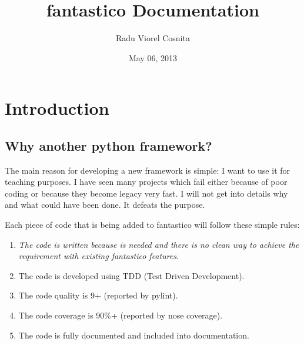 \documentclass[letterpaper,10pt,english]{sphinxmanual}
\title{fantastico Documentation}
\date{May 06, 2013}
\author{Radu Viorel Cosnita}
\begin{document}
\maketitle
\tableofcontents
{}\label{index::doc}



\chapter{Introduction}
\label{intro:introduction}\label{intro::doc}\label{intro:fantastico-framework}

\section{Why another python framework?}
\label{intro:why-another-python-framework}
The main reason for developing a new framework is simple: I want to use it for teaching purposes. I have seen many projects which
fail either because of poor coding or because they become legacy very fast. I will not get into details why and what could have
been done. It defeats the purpose.

Each piece of code that is being added to fantastico will follow these simple rules:
\begin{enumerate}
\item {} 
\emph{The code is written because is needed and there is no clean way to achieve the requirement with existing fantastico features}.

\item {} 
The code is developed using TDD (Test Driven Development).

\item {} 
The code quality is 9+ (reported by pylint).

\item {} 
The code coverage is 90\%+ (reported by nose coverage).

\item {} 
The code is fully documented and included into documentation.

\end{enumerate}
\end{document}
